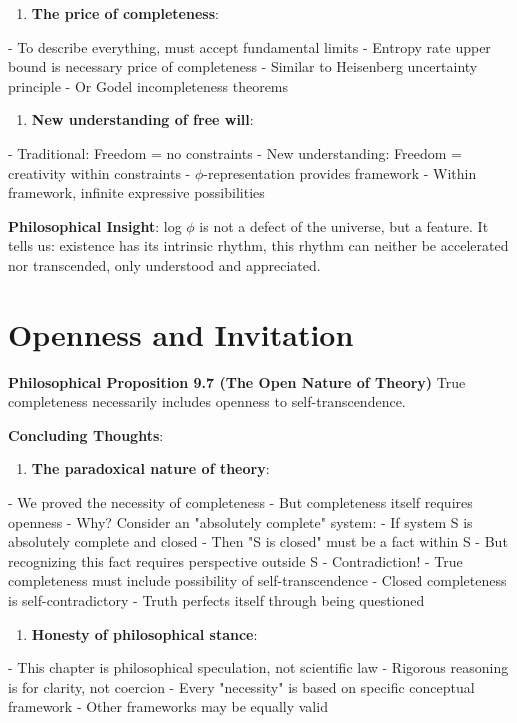 \begin{enumerate}
\item \textbf{The price of completeness}:
\end{enumerate}
   - To describe everything, must accept fundamental limits
   - Entropy rate upper bound is necessary price of completeness
   - Similar to Heisenberg uncertainty principle
   - Or Godel incompleteness theorems

\begin{enumerate}
\item \textbf{New understanding of free will}:
\end{enumerate}
   - Traditional: Freedom = no constraints
   - New understanding: Freedom = creativity within constraints
   - $\phi$-representation provides framework
   - Within framework, infinite expressive possibilities

\textbf{Philosophical Insight}:
log $\phi$ is not a defect of the universe, but a feature.
It tells us: existence has its intrinsic rhythm,
this rhythm can neither be accelerated nor transcended,
only understood and appreciated.

\section{Openness and Invitation}
\label{sec:ch09_philosophy:openness-and-invitation}

\textbf{Philosophical Proposition 9.7 (The Open Nature of Theory)}
True completeness necessarily includes openness to self-transcendence.

\textbf{Concluding Thoughts}:

\begin{enumerate}
\item \textbf{The paradoxical nature of theory}:
\end{enumerate}
   - We proved the necessity of completeness
   - But completeness itself requires openness
   - Why? Consider an "absolutely complete" system:
     - If system S is absolutely complete and closed
     - Then "S is closed" must be a fact within S
     - But recognizing this fact requires perspective outside S
     - Contradiction!
   - True completeness must include possibility of self-transcendence
   - Closed completeness is self-contradictory
   - Truth perfects itself through being questioned

\begin{enumerate}
\item \textbf{Honesty of philosophical stance}:
\end{enumerate}
   - This chapter is philosophical speculation, not scientific law
   - Rigorous reasoning is for clarity, not coercion
   - Every "necessity" is based on specific conceptual framework
   - Other frameworks may be equally valid

